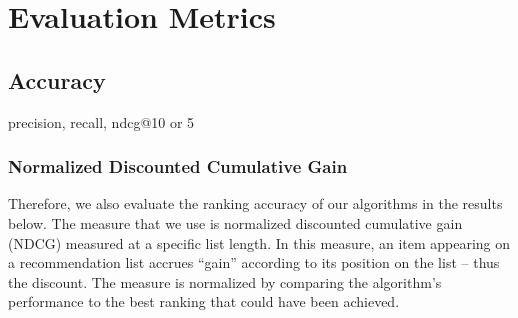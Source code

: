 \begin{comment}
    \subsection{Yelp dataset}
    
    The original Yelp.com data included 6.7 million reviews from 1.6 million users on 192,609 businesses from different industries. We used a filtered subset, Yelp\_core40 \cite{mansoury2019bias}, which includes users who rated at least 40 businesses and businesses which were rated by at least 40 users. In the Yelp\_core40, there are many business categories  (e.g. car dealers, airports, or different types of restaurants, etc.). We limited the data set to restaurant/food establishments, using both "restaurant" and "food" labels for filtering. After pre-processing, the data set included 85,041 ratings by 1,355 users over 1,077 restaurants, covering 231 categories. The sparsity of Yelp is 5.83\%. The categories are defined by the labels provided in the original Yelp data set. Some of the categories are very popular (e.g. "American (New)", "Breakfast \& Brunch", etc.), while some of them are extremely specific (e.g. "Pretzels", "Shaved snow", etc.). There were also many establishments with multiple labels, which meant that they belonged to different item categories. 

\end{comment}

\section{Evaluation Metrics}
    \subsection{Accuracy}
    precision, recall, ndcg@10 or 5
        \subsubsection{Normalized Discounted Cumulative Gain}
        Therefore, we also evaluate the ranking accuracy of our algorithms in the results below. The measure that we use is normalized discounted cumulative gain (NDCG) measured at a specific list length. In this measure, an item appearing on a recommendation list accrues ``gain'' according to its position on the list -- thus the discount. The measure is normalized by comparing the algorithm's performance to the best ranking that could have been achieved. 

